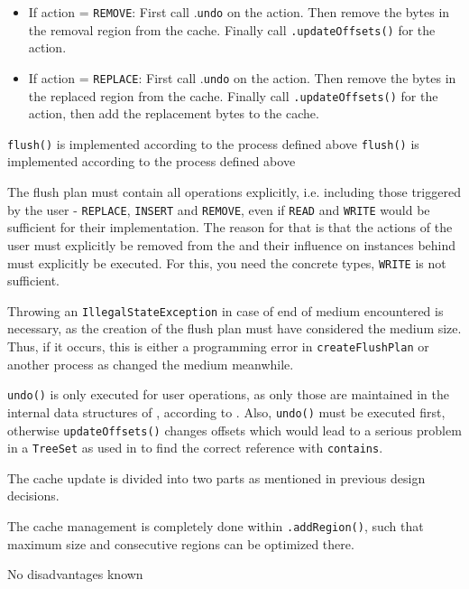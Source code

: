 \begin{enumerate}
\begin{itemize}
\item If action = \texttt{REMOVE}: First call \MediumChangeManager{}.\texttt{undo} on the action. Then remove the bytes in the removal region from the cache. Finally call \MediumReferenceRepository{}\texttt{.updateOffsets()} for the action.
\item If action = \texttt{REPLACE}: First call \MediumChangeManager{}.\texttt{undo} on the action. Then remove the bytes in the replaced region from the cache. Finally call \MediumReferenceRepository{}\texttt{.updateOffsets()} for the action, then add the replacement bytes to the cache.
\end{itemize}
\end{enumerate}

{%
\texttt{flush()} is implemented according to the process defined above
}
{%
\texttt{flush()} is implemented according to the process defined above
}
{%
The flush plan must contain all operations explicitly, i.e. including those triggered by the user - \texttt{REPLACE}, \texttt{INSERT} and \texttt{REMOVE}, even if \texttt{READ} and \texttt{WRITE} would be sufficient for their implementation. The reason for that is that the actions of the user must explicitly be removed from the \MediumChangeManager{} and their influence on \IMediumReference{} instances behind must explicitly be executed. For this, you need the concrete types, \texttt{WRITE} is not sufficient.

Throwing an \texttt{IllegalStateException} in case of end of medium encountered is necessary, as the creation of the flush plan must have considered the medium size. Thus, if it occurs, this is either a programming error in \texttt{createFlushPlan} or another process as changed the medium meanwhile.

\texttt{undo()} is only executed for user operations, as only those are maintained in the internal data structures of \MediumChangeManager{}, according to . Also, \texttt{undo()} must be executed first, otherwise \texttt{updateOffsets()} changes offsets which would lead to a serious problem in a \texttt{TreeSet} as used in \MediumChangeManager{} to find the correct reference with \texttt{contains}.

The cache update is divided into two parts as mentioned in previous design decisions.

The cache management is completely done within \MediumCache{}\texttt{.addRegion()}, such that maximum size and consecutive regions can be optimized there.
}
{%
No disadvantages known
}

